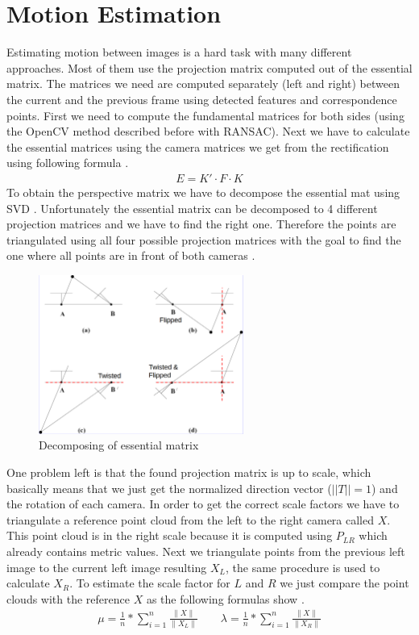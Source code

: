 \documentclass[11pt]{article}
\begin{document}
	\section{Motion Estimation}
	
	Estimating motion between images is a hard task with many different approaches. Most of them use the projection matrix computed out of the essential matrix. The matrices we need are computed separately (left and right) between the current and the previous frame using detected features and correspondence points. First we need to compute the fundamental matrices for both sides (using the OpenCV method described before with RANSAC). Next we have to calculate the essential matrices using the camera matrices we get from the rectification using following formula \cite{HartleyZisserman}.
	\begin{align}
	  E = K{'} \cdot F \cdot K
	\end{align}
	To obtain the perspective matrix we have to decompose the essential mat using SVD \cite{SVD_Essential}. Unfortunately the essential matrix can be decomposed to 4 different projection matrices and we have to find the right one. Therefore the points are triangulated using all four possible projection matrices with the goal to find the one where all points are in front of both cameras \cite{ComputerVision}.
	
	\begin{figure}[H]
		\centering
		\includegraphics[width=0.6\textwidth]{images/possible_P_Mats.png}
		\caption{Decomposing of essential matrix \cite{ComputerVision}}
	\end{figure}

	One problem left is that the found projection matrix is up to scale, which basically means that we just get the normalized direction vector ($||T|| = 1$) and the rotation of each camera. In order to get the correct scale factors we have to triangulate a reference point cloud from the left to the right camera called $X$. This point cloud is in the right scale because it is computed using $P_{LR}$ which already contains metric values. Next we triangulate points from the previous left image to the current left image resulting $X_L$, the same procedure is used to calculate $X_R$. To estimate the scale factor for $L$ and $R$ we just compare the point clouds with the reference $X$ as the following formulas show \cite{scaleFactors}.
	\begin{align}
	  \mu = \frac{1}{n} * \sum_{i=1}^{n} \frac{\|X\|}{\|X_L\|} \qquad
	  \lambda = \frac{1}{n} * \sum_{i=1}^{n} \frac{\|X\|}{\|X_R\|}
	\end{align}
\end{document}
